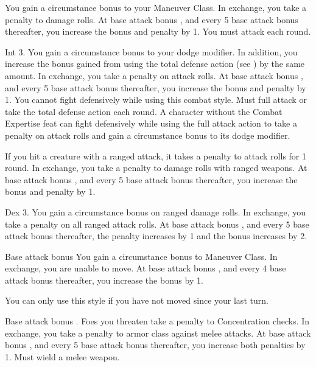  You gain a  circumstance bonus to your Maneuver Class. In exchange, you take a  penalty to damage rolls. At base attack bonus , and every 5 base attack bonus thereafter, you increase the bonus and penalty by 1.
 You must attack each round.

 Int 3.
 You gain a  circumstance bonus to your dodge modifier. In addition, you increase the bonus gained from using the total defense action (see ) by the same amount. In exchange, you take a  penalty on attack rolls. At base attack bonus , and every 5 base attack bonus thereafter, you increase the bonus and penalty by 1. You cannot fight defensively while using this combat style.
 Must full attack or take the total defense action each round.
 A character without the Combat Expertise feat can fight defensively while using the full attack action to take a  penalty on attack rolls and gain a  circumstance bonus to its dodge modifier.

 If you hit a creature with a ranged attack, it takes a  penalty to attack rolls for 1 round. In exchange, you take a  penalty to damage rolls with ranged weapons. At base attack bonus , and every 5 base attack bonus thereafter, you increase the bonus and penalty by 1.

 Dex 3.
 You gain a  circumstance bonus on ranged damage rolls. In exchange, you take a  penalty on all ranged attack rolls. At base attack bonus , and every 5 base attack bonus thereafter, the penalty increases by 1 and the bonus increases by 2.

 Base attack bonus 
 You gain a  circumstance bonus to Maneuver Class. In exchange, you are unable to move. At base attack bonus , and every 4 base attack bonus thereafter, you increase the bonus by 1.

You can only use this style if you have not moved since your last turn.

 Base attack bonus .
 Foes you threaten take a  penalty to Concentration checks. In exchange, you take a  penalty to armor class against melee attacks. At base attack bonus , and every 5 base attack bonus thereafter, you increase both penalties by 1.
 Must wield a melee weapon.

